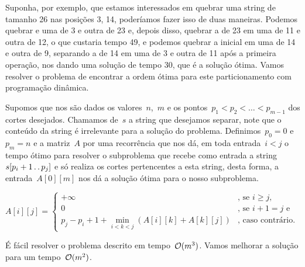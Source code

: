 Suponha, por exemplo, que estamos interessados em quebrar uma string de tamanho 26 nas posições 3, 14, poderíamos fazer isso de duas maneiras. Podemos quebrar e uma de 3 e outra de 23 e, depois disso, quebrar a de 23 em uma de 11 e outra de 12, o que custaria tempo 49, e podemos quebrar a inicial em uma de 14 e outra de 9, separando a de 14 em uma de 3 e outra de 11 após a primeira operação, nos dando uma solução de tempo 30, que é a solução ótima. Vamos resolver o problema de encontrar a ordem ótima para este particionamento com programação dinâmica.

Supomos que nos são dados os valores~$n$,~$m$ e os pontos~$p_1 < p_2 < \dots < p_{m-1}$ dos cortes desejados. Chamamos de~$s$ a string que desejamos separar, note que o conteúdo da string é irrelevante para a solução do problema. Definimos~$p_0 = 0$ e~$p_m = n$ e a matriz~$A$ por uma recorrência que nos dá, em toda entrada~$i<j$ o tempo ótimo para resolver o subproblema que recebe como entrada a string~$s[p_i + 1 \,.\,.\, p_j]$ e só realiza os cortes pertencentes a esta string, desta forma, a entrada~$A[0][m]$ nos dá a solução ótima para o nosso subproblema. 

\begin{equation*}
A[i][j] = \begin{cases}
    +\infty                                                     & \text{, se } i \geq j \text{,} \\
    0                                                           & \text{, se } i + 1 = j \text{ e } \\
    p_j - p_i + 1 + \min\limits_{i < k < j} (A[i][k] + A[k][j]) & \text{, caso contrário. }
\end{cases}
\end{equation*}

É fácil resolver o problema descrito em tempo~$\mathcal{O}(m^3)$. Vamos melhorar a solução para um tempo~$\mathcal{O}(m^2)$.


